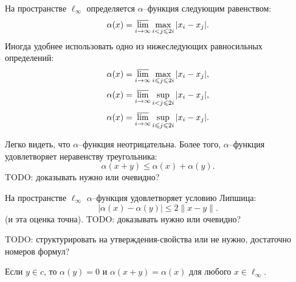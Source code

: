 На пространстве $\ell_\infty$ определяется $\alpha$--функция следующим равенством:
\begin{equation}
	\alpha(x) = \varlimsup_{i\to\infty} \max_{i<j\leqslant 2i} |x_i - x_j|
	.
\end{equation}
Иногда удобнее использовать одно из нижеследующих равносильных определений:
\begin{equation}
	\alpha(x) = \varlimsup_{i\to\infty} \max_{i \leqslant j\leqslant 2i} |x_i - x_j|
	,
\end{equation}
\begin{equation}
	\alpha(x) = \varlimsup_{i\to\infty} \sup_{i<j\leqslant 2i} |x_i - x_j|
	,
\end{equation}
\begin{equation}
	\alpha(x) = \varlimsup_{i\to\infty} \sup_{i \leqslant j\leqslant 2i} |x_i - x_j|
	.
\end{equation}

Легко видеть, что $\alpha$--функция неотрицательна.
Более того, $\alpha$--функция удовлетворяет неравенству треугольника:
\begin{equation}
	\alpha(x+y) \leq \alpha(x) + \alpha(y)
	.
\end{equation}
TODO: доказывать нужно или очевидно?

На пространстве $\ell_\infty$ $\alpha$--функция удовлетворяет условию Липшица:
\begin{equation}\label{alpha_Lipshitz}
	|\alpha(x) - \alpha(y)| \leq 2 \|x-y\|
	.
\end{equation}
(и эта оценка точна).
TODO: доказывать нужно или очевидно?

TODO: структурировать на утверждения-свойства или не нужно, достаточно номеров формул?

Если $y\in c$, то $\alpha(y) = 0$ и $\alpha(x+y) = \alpha(x)$ для любого $x \in \ell_\infty$.

